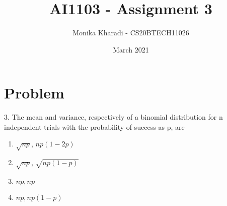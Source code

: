 \documentclass[journal,12pt,two column]{IEEEtran}
\title{AI1103 - Assignment 3}
\author{Monika Kharadi - CS20BTECH11026}
\date{March 2021}
\begin{document}
\maketitle
\section*{\large\textbf{Problem }}
3. The mean and variance, respectively of a binomial distribution for n independent trials with the probability of success as p, are \\
\begin{enumerate}
    \item $\sqrt{np}$, $np(1-2p)$\\
    \item $\sqrt{np}$, $\sqrt{np(1-p)}$\\
    \item $np, np$ \\
    \item $np, np(1-p)$ 
\end{enumerate}
\end{document}
